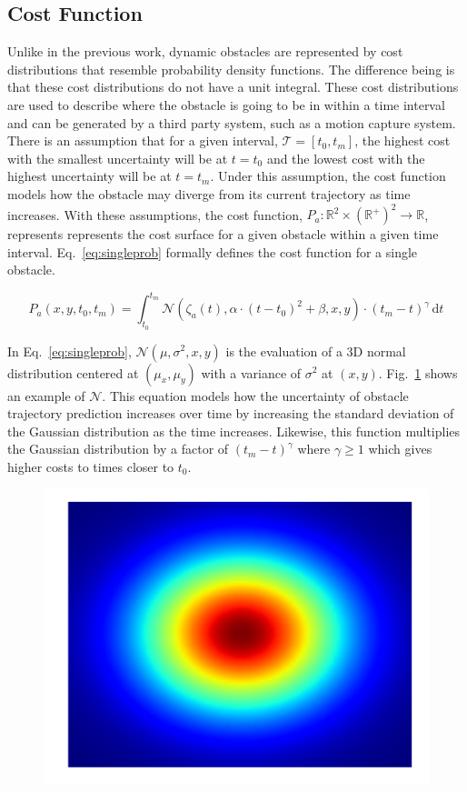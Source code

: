 \subsection{Cost Function}

\label{sec:cost}

Unlike in the previous work, dynamic obstacles are represented by cost
distributions that resemble probability density functions. The difference being
is that these cost distributions do not have a unit integral. These cost
distributions are used to describe where the obstacle is going to be in within
a time interval and can be generated by a third party system, such as a motion
capture system. There is an assumption that for a given interval, $\mathcal{T}
= [t_0, t_m]$, the highest cost with the smallest uncertainty will be at $t =
t_0$ and the lowest cost with the highest uncertainty will be at $t = t_m$.
Under this assumption, the cost function models how the obstacle may diverge
from its current trajectory as time increases. With these assumptions, the cost
function, $P_a: \mathbb{R}^2 \times (\mathbb{R}^+)^2 \rightarrow
\mathbb{R}$, represents represents the cost surface for a given
obstacle within a given time interval. Eq.~\ref{eq:singleprob} formally defines
the cost function for a single obstacle.


\begin{equation}
    P_a(x, y, t_0, t_m) = \int^{t_m}_{t_0}
    \mathcal{N}(\zeta_a(t), \alpha \cdot (t - t_0)^2 + \beta, x, y) \cdot
    (t_m - t)^{\gamma} \,\mathrm{d}t
    \label{eq:singleprob}
\end{equation}

In Eq.~\ref{eq:singleprob}, $\mathcal{N}(\mu, \sigma^2, x, y)$ is the
evaluation of a 3D normal distribution centered at $(\mu_x, \mu_y)$ with a
variance of $\sigma^2$ at $(x, y)$. Fig.~\ref{fig:normal_3d} shows an example
of $\mathcal{N}$. This equation models how the uncertainty of obstacle
trajectory prediction increases over time by increasing the standard deviation
of the Gaussian distribution as the time increases.  Likewise, this function
multiplies the Gaussian distribution by a factor of $(t_m - t)^{\gamma}$ where
$\gamma \geq 1$ which gives higher costs to times closer to $t_0$.

\begin{figure}[h!]
    \centering
    \includegraphics[width=0.60\linewidth]{figs/normal_3d}
    \caption{}
    \label{fig:normal_3d}
\end{figure}

